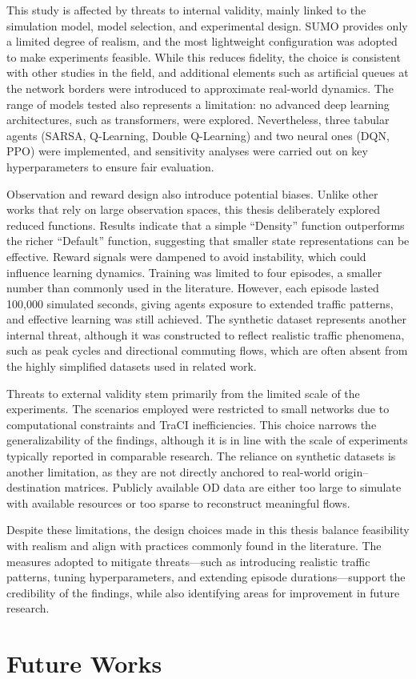 This study is affected by threats to internal validity, mainly linked to the simulation model, model selection, and experimental design. SUMO provides only a limited degree of realism, and the most lightweight configuration was adopted to make experiments feasible. While this reduces fidelity, the choice is consistent with other studies in the field, and additional elements such as artificial queues at the network borders were introduced to approximate real-world dynamics. The range of models tested also represents a limitation: no advanced deep learning architectures, such as transformers, were explored. Nevertheless, three tabular agents (SARSA, Q-Learning, Double Q-Learning) and two neural ones (DQN, PPO) were implemented, and sensitivity analyses were carried out on key hyperparameters to ensure fair evaluation.

Observation and reward design also introduce potential biases. Unlike other works that rely on large observation spaces, this thesis deliberately explored reduced functions. Results indicate that a simple “Density” function outperforms the richer “Default” function, suggesting that smaller state representations can be effective. Reward signals were dampened to avoid instability, which could influence learning dynamics. Training was limited to four episodes, a smaller number than commonly used in the literature. However, each episode lasted 100,000 simulated seconds, giving agents exposure to extended traffic patterns, and effective learning was still achieved. The synthetic dataset represents another internal threat, although it was constructed to reflect realistic traffic phenomena, such as peak cycles and directional commuting flows, which are often absent from the highly simplified datasets used in related work.

Threats to external validity stem primarily from the limited scale of the experiments. The scenarios employed were restricted to small networks due to computational constraints and TraCI inefficiencies. This choice narrows the generalizability of the findings, although it is in line with the scale of experiments typically reported in comparable research. The reliance on synthetic datasets is another limitation, as they are not directly anchored to real-world origin–destination matrices. Publicly available OD data are either too large to simulate with available resources or too sparse to reconstruct meaningful flows.

Despite these limitations, the design choices made in this thesis balance feasibility with realism and align with practices commonly found in the literature. The measures adopted to mitigate threats—such as introducing realistic traffic patterns, tuning hyperparameters, and extending episode durations—support the credibility of the findings, while also identifying areas for improvement in future research.

\section{Future Works}
